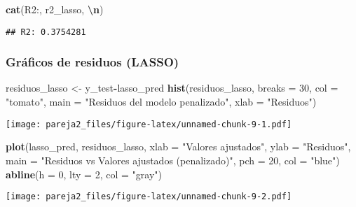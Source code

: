 \documentclass[
]{article}
\newenvironment{Shaded}{\begin{snugshade}}{\end{snugshade}}
\newcommand{\AttributeTok}[1]{\textcolor[rgb]{0.13,0.29,0.53}{#1}}
\newcommand{\DecValTok}[1]{\textcolor[rgb]{0.00,0.00,0.81}{#1}}
\newcommand{\FunctionTok}[1]{\textcolor[rgb]{0.13,0.29,0.53}{\textbf{#1}}}
\newcommand{\NormalTok}[1]{#1}
\newcommand{\OtherTok}[1]{\textcolor[rgb]{0.56,0.35,0.01}{#1}}
\newcommand{\SpecialCharTok}[1]{\textcolor[rgb]{0.81,0.36,0.00}{\textbf{#1}}}
\newcommand{\StringTok}[1]{\textcolor[rgb]{0.31,0.60,0.02}{#1}}
\begin{document}
\begin{Shaded}
\begin{Highlighting}[]
\FunctionTok{cat}\NormalTok{(}\StringTok{\textquotesingle{}R2:\textquotesingle{}}\NormalTok{, r2\_lasso, }\StringTok{\textquotesingle{}}\SpecialCharTok{\textbackslash{}n}\StringTok{\textquotesingle{}}\NormalTok{)}
\end{Highlighting}
\end{Shaded}

\begin{verbatim}
## R2: 0.3754281
\end{verbatim}

\hypertarget{gruxe1ficos-de-residuos-lasso}{%
\subsubsection{Gráficos de residuos
(LASSO)}\label{gruxe1ficos-de-residuos-lasso}}

\begin{Shaded}
\begin{Highlighting}[]
\NormalTok{residuos\_lasso }\OtherTok{\textless{}{-}}\NormalTok{ y\_test}\SpecialCharTok{{-}}\NormalTok{lasso\_pred}
\FunctionTok{hist}\NormalTok{(residuos\_lasso, }\AttributeTok{breaks =} \DecValTok{30}\NormalTok{, }\AttributeTok{col =} \StringTok{"tomato"}\NormalTok{, }\AttributeTok{main =} \StringTok{"Residuos del modelo penalizado"}\NormalTok{, }\AttributeTok{xlab =} \StringTok{"Residuos"}\NormalTok{)}
\end{Highlighting}
\end{Shaded}

\texttt{[image: pareja2\_files/figure-latex/unnamed-chunk-9-1.pdf]}

\begin{Shaded}
\begin{Highlighting}[]
\FunctionTok{plot}\NormalTok{(lasso\_pred, residuos\_lasso, }\AttributeTok{xlab =} \StringTok{"Valores ajustados"}\NormalTok{, }\AttributeTok{ylab =} \StringTok{"Residuos"}\NormalTok{, }\AttributeTok{main =} \StringTok{"Residuos vs Valores ajustados (penalizado)"}\NormalTok{, }\AttributeTok{pch =} \DecValTok{20}\NormalTok{, }\AttributeTok{col =} \StringTok{"blue"}\NormalTok{)}
\FunctionTok{abline}\NormalTok{(}\AttributeTok{h =} \DecValTok{0}\NormalTok{, }\AttributeTok{lty =} \DecValTok{2}\NormalTok{, }\AttributeTok{col =} \StringTok{"gray"}\NormalTok{)}
\end{Highlighting}
\end{Shaded}

\texttt{[image: pareja2\_files/figure-latex/unnamed-chunk-9-2.pdf]}
\end{document}
